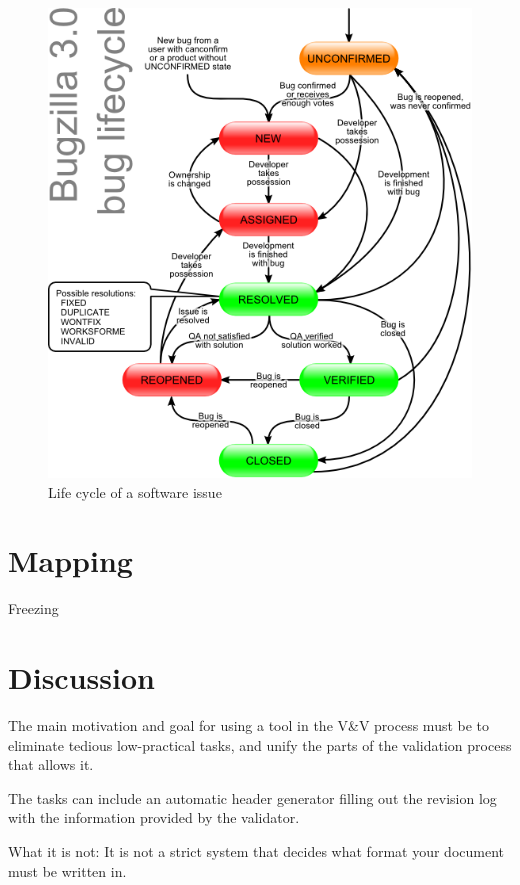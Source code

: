 \documentclass[10pt,a4paper]{article}
\begin{document}
\begin{figure}[h]
\centering
\includegraphics[scale=0.45]{fig/Bugzilla_Lifecycle_color-aqua.png} 
\caption{Life cycle of a software issue}
\label{fig:software_issue_life_cycle}
\end{figure}


\section{Mapping}
Freezing 

\section{Discussion}
The main motivation and goal for using a tool in the V\&V process must be to eliminate tedious low-practical tasks, and unify the parts of the validation process that allows it.

The tasks can include an automatic header generator filling out the revision log with the information provided by the validator.

What it is not:
It is not a strict system that decides what format your document must be written in.
\end{document}
